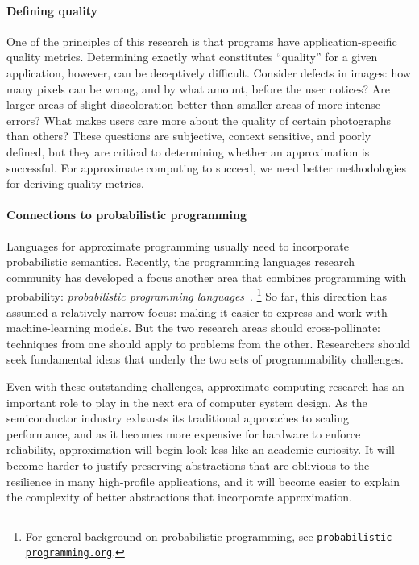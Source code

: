\paragraph{Defining quality}
One of the principles of this research is that programs have
application-specific quality metrics.
Determining exactly what constitutes ``quality'' for a given application,
however, can be deceptively difficult.
Consider defects in images:
how many pixels can be wrong, and by what amount, before the user notices?
Are larger areas of slight discoloration better than smaller areas of more
intense errors?
What makes users care more about the quality of certain photographs than
others?
These questions are subjective, context sensitive, and poorly defined, but
they are critical to determining whether an approximation is successful.
For approximate computing to succeed, we need better methodologies for
deriving quality metrics.

\paragraph{Connections to probabilistic programming}
Languages for app\-roximate program\-ming usually need to incorporate probabilistic
semantics.
Recently, the programming languages research community has developed a focus
another area that combines programming with probability:
\emph{probabilistic programming languages}~\cite{BBGR13, wingate-lightweight,
  church, chaganty, pfeffersample, probdsl, koller}.%
\footnote{%
    For general background on probabilistic programming, see
    \href{http://probabilistic-programming.org/}{\texttt{probabilistic-programming.org}}.%
}
So far, this direction has assumed a relatively narrow focus:
making it easier to express and work with machine-learning models.
But the two research areas should cross-pollinate:
techniques from one should apply to problems from the other.
Researchers should seek fundamental ideas that underly the two sets of
programmability challenges.

\vspace{\baselineskip}
\noindent
Even with these outstanding challenges, approximate computing research
has an important role to play in the next era of computer system design.
As the semiconductor industry exhausts its traditional approaches to scaling
performance, and as it becomes more expensive for hardware to enforce
reliability,
approximation will begin look less like an academic curiosity.
It will become harder to justify preserving abstractions that are oblivious to
the resilience in many high-profile applications,
and it will become easier to explain the complexity of better
abstractions that incorporate approximation.
